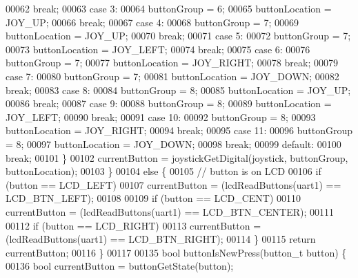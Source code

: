 \begin{DoxyCode}
00062             \textcolor{keywordflow}{break};
00063         \textcolor{keywordflow}{case} 3:
00064             buttonGroup = 6;
00065             buttonLocation = JOY\_UP;
00066             \textcolor{keywordflow}{break};
00067         \textcolor{keywordflow}{case} 4:
00068             buttonGroup = 7;
00069             buttonLocation = JOY\_UP;
00070             \textcolor{keywordflow}{break};
00071         \textcolor{keywordflow}{case} 5:
00072             buttonGroup = 7;
00073             buttonLocation = JOY\_LEFT;
00074             \textcolor{keywordflow}{break};
00075         \textcolor{keywordflow}{case} 6:
00076             buttonGroup = 7;
00077             buttonLocation = JOY\_RIGHT;
00078             \textcolor{keywordflow}{break};
00079         \textcolor{keywordflow}{case} 7:
00080             buttonGroup = 7;
00081             buttonLocation = JOY\_DOWN;
00082             \textcolor{keywordflow}{break};
00083         \textcolor{keywordflow}{case} 8:
00084             buttonGroup = 8;
00085             buttonLocation = JOY\_UP;
00086             \textcolor{keywordflow}{break};
00087         \textcolor{keywordflow}{case} 9:
00088             buttonGroup = 8;
00089             buttonLocation = JOY\_LEFT;
00090             \textcolor{keywordflow}{break};
00091         \textcolor{keywordflow}{case} 10:
00092             buttonGroup = 8;
00093             buttonLocation = JOY\_RIGHT;
00094             \textcolor{keywordflow}{break};
00095         \textcolor{keywordflow}{case} 11:
00096             buttonGroup = 8;
00097             buttonLocation = JOY\_DOWN;
00098             \textcolor{keywordflow}{break};
00099         \textcolor{keywordflow}{default}:
00100             \textcolor{keywordflow}{break};
00101         \}
00102         currentButton = joystickGetDigital(joystick, buttonGroup, buttonLocation);
00103     \}
00104     \textcolor{keywordflow}{else} \{
00105         \textcolor{comment}{// button is on LCD}
00106         \textcolor{keywordflow}{if} (button == LCD_LEFT)
00107             currentButton = (lcdReadButtons(uart1) == LCD\_BTN\_LEFT);
00108 
00109         \textcolor{keywordflow}{if} (button == LCD_CENT)
00110             currentButton = (lcdReadButtons(uart1) == LCD\_BTN\_CENTER);
00111 
00112         \textcolor{keywordflow}{if} (button == LCD_RIGHT)
00113             currentButton = (lcdReadButtons(uart1) == LCD\_BTN\_RIGHT);
00114     \}
00115     \textcolor{keywordflow}{return} currentButton;
00116 \}
00117 
00135 \textcolor{keywordtype}{bool} buttonIsNewPress(button_t button) \{
00136     \textcolor{keywordtype}{bool} currentButton = buttonGetState(button);

\end{DoxyCode}
